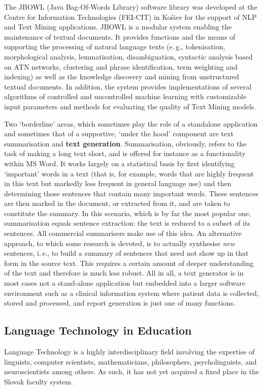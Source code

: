 \begin{multicols}{2}
The JBOWL (Java Bag-Of-Words Library) software library was developed at the Centre for Information Technologies (FEI-CIT) in Košice for the support of NLP and Text Mining applications. JBOWL is a modular system enabling the maintenance of textual documents. It provides functions and the means of supporting the processing of natural language texts (e.\,g., tokenisation, morphological analysis, lemmatisation, disambiguation, syntactic analysis based on ATN networks, clustering and phrase identification, term weighting and indexing) as well as the knowledge discovery and mining from unstructured textual documents. In addition, the system provides implementations of several algorithms of controlled and uncontrolled machine learning with customizable input parameters and methods for evaluating the quality of Text Mining models.

Two ‘borderline’ areas, which sometimes play the role of a standalone application and sometimes that of a supportive, ‘under the hood’ component are text summarisation and \textbf{text generation}. Summarisation, obviously, refers to the task of making a long text short, and is offered for instance as a functionality within MS Word. It works largely on a statistical basis by first identifying ‘important’ words in a text (that is, for example, words that are highly frequent in this text but markedly less frequent in general language use) and then determining those sentences that contain many important words. These sentences are then marked in the document, or extracted from it, and are taken to constitute the summary. In this scenario, which is by far the most popular one, summarisation equals sentence extraction: the text is reduced to a subset of its sentences. All commercial summarisers make use of this idea. An alternative approach, to which some research is devoted, is to actually synthesise \emph{new} sentences, i.\,e., to build a summary of sentences that need not show up in that form in the source text. This requires a certain amount of deeper understanding of the text and therefore is much less robust. All in all, a text generator is in most cases not a stand-alone application but embedded into a larger software environment such as a clinical information system where patient data is collected, stored and processed, and report generation is just one of many functions.


\subsection{Language Technology in Education}
Language Technology is a highly interdisciplinary field involving the expertise of linguists, computer scientists, mathematicians, philosophers, psycholinguists, and neuroscientists among others. As such, it has not yet acquired a fixed place in the Slovak faculty system.


\end{multicols}
